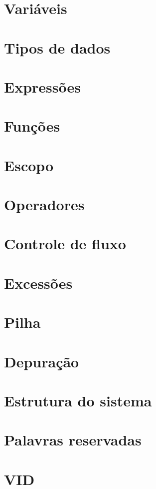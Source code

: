 \documentclass[12pt]{article}
\begin{document}
\section{Variáveis}
\section{Tipos de dados}
\section{Expressões}
\section{Funções}
\section{Escopo}
\section{Operadores}
\section{Controle de fluxo}
\section{Excessões}
\section{Pilha}
\section{Depuração}
\section{Estrutura do sistema}
\section{Palavras reservadas}
\section{VID}
\end{document}
